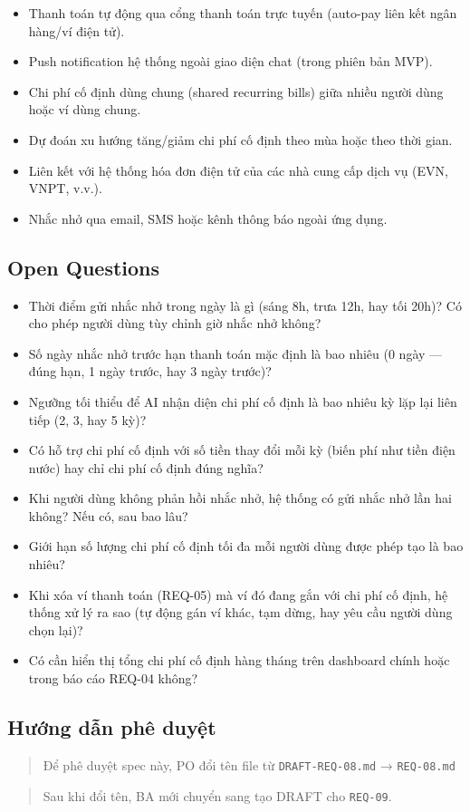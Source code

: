 \begin{itemize}
\item Thanh toán tự động qua cổng thanh toán trực tuyến (auto-pay liên kết ngân hàng/ví điện tử).
\item Push notification hệ thống ngoài giao diện chat (trong phiên bản MVP).
\item Chi phí cố định dùng chung (shared recurring bills) giữa nhiều người dùng hoặc ví dùng chung.
\item Dự đoán xu hướng tăng/giảm chi phí cố định theo mùa hoặc theo thời gian.
\item Liên kết với hệ thống hóa đơn điện tử của các nhà cung cấp dịch vụ (EVN, VNPT, v.v.).
\item Nhắc nhở qua email, SMS hoặc kênh thông báo ngoài ứng dụng.
\end{itemize}
\subsection{Open Questions}

\begin{itemize}
\item [ ] Thời điểm gửi nhắc nhở trong ngày là gì (sáng 8h, trưa 12h, hay tối 20h)? Có cho phép người dùng tùy chỉnh giờ nhắc nhở không?
\item [ ] Số ngày nhắc nhở trước hạn thanh toán mặc định là bao nhiêu (0 ngày — đúng hạn, 1 ngày trước, hay 3 ngày trước)?
\item [ ] Ngưỡng tối thiểu để AI nhận diện chi phí cố định là bao nhiêu kỳ lặp lại liên tiếp (2, 3, hay 5 kỳ)?
\item [ ] Có hỗ trợ chi phí cố định với số tiền thay đổi mỗi kỳ (biến phí như tiền điện nước) hay chỉ chi phí cố định đúng nghĩa?
\item [ ] Khi người dùng không phản hồi nhắc nhở, hệ thống có gửi nhắc nhở lần hai không? Nếu có, sau bao lâu?
\item [ ] Giới hạn số lượng chi phí cố định tối đa mỗi người dùng được phép tạo là bao nhiêu?
\item [ ] Khi xóa ví thanh toán (REQ-05) mà ví đó đang gắn với chi phí cố định, hệ thống xử lý ra sao (tự động gán ví khác, tạm dừng, hay yêu cầu người dùng chọn lại)?
\item [ ] Có cần hiển thị tổng chi phí cố định hàng tháng trên dashboard chính hoặc trong báo cáo REQ-04 không?
\end{itemize}
\subsection{Hướng dẫn phê duyệt}

\begin{quote}
Để phê duyệt spec này, PO đổi tên file từ \texttt{DRAFT-REQ-08.md} → \texttt{REQ-08.md}
\end{quote}

\begin{quote}
Sau khi đổi tên, BA mới chuyển sang tạo DRAFT cho \texttt{REQ-09}.
\end{quote}
